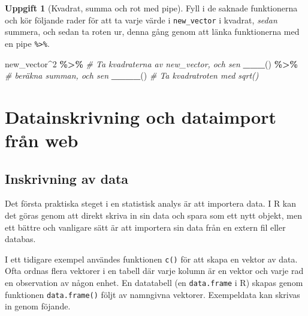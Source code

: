 \documentclass[
]{book}
\newenvironment{Shaded}{\begin{snugshade}}{\end{snugshade}}
\newcommand{\CommentTok}[1]{\textcolor[rgb]{0.56,0.35,0.01}{\textit{#1}}}
\newcommand{\DecValTok}[1]{\textcolor[rgb]{0.00,0.00,0.81}{#1}}
\newcommand{\FunctionTok}[1]{\textcolor[rgb]{0.13,0.29,0.53}{\textbf{#1}}}
\newcommand{\NormalTok}[1]{#1}
\newcommand{\SpecialCharTok}[1]{\textcolor[rgb]{0.81,0.36,0.00}{\textbf{#1}}}
\theoremstyle{definition}
\theoremstyle{definition}
\theoremstyle{definition}
\newtheorem{exercise}{Uppgift}[chapter]
\theoremstyle{definition}
\theoremstyle{remark}
\begin{document}
\begin{exercise}[Kvadrat, summa och rot med pipe]

Fyll i de saknade funktionerna och kör följande rader för att ta varje värde i \texttt{new\_vector} i kvadrat, \emph{sedan} summera, och sedan ta roten ur, denna gång genom att länka funktionerna med en pipe \texttt{\%\textgreater{}\%}.

\begin{Shaded}
\begin{Highlighting}[]
\NormalTok{new\_vector}\SpecialCharTok{\^{}}\DecValTok{2} \SpecialCharTok{\%\textgreater{}\%}                       \CommentTok{\# Ta kvadraterna av new\_vector, och sen}
  \FunctionTok{\_\_\_}\NormalTok{() }\SpecialCharTok{\%\textgreater{}\%}                            \CommentTok{\# beräkna summan, och sen}
  \FunctionTok{\_\_\_\_}\NormalTok{()                               }\CommentTok{\# Ta kvadratroten med sqrt()}
\end{Highlighting}
\end{Shaded}

\end{exercise}

\hypertarget{datainskrivning-och-dataimport-fruxe5n-web}{%
\section{Datainskrivning och dataimport från web}\label{datainskrivning-och-dataimport-fruxe5n-web}}

\hypertarget{inskrivning-av-data}{%
\subsection{Inskrivning av data}\label{inskrivning-av-data}}

Det första praktiska steget i en statistisk analys är att importera data. I R kan det göras genom att direkt skriva in sin data och spara som ett nytt objekt, men ett bättre och vanligare sätt är att importera sin data från en extern fil eller databas.

I ett tidigare exempel användes funktionen \texttt{c()} för att skapa en vektor av data. Ofta ordnas flera vektorer i en tabell där varje kolumn är en vektor och varje rad en observation av någon enhet. En datatabell (en \texttt{data.frame} i R) skapas genom funktionen \texttt{data.frame()} följt av namngivna vektorer. Exempeldata kan skrivas in genom föjande.
\end{document}
